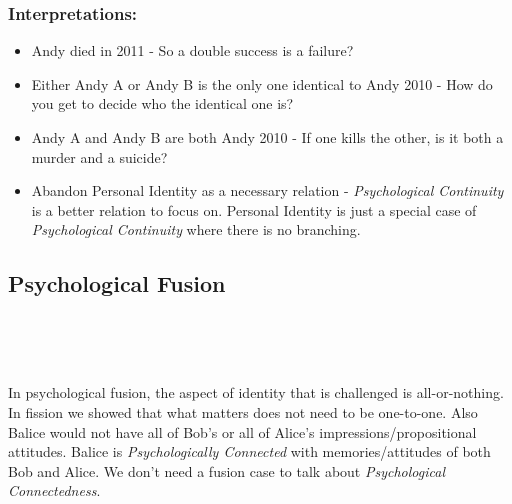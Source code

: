 \documentclass[11pt]{article}
\begin{document}
\subsubsection*{Interpretations:}
\label{sec:org25afbcd}
\begin{itemize}
\item Andy died in 2011 -
\label{sec:org915f9e2}
So a double success is a failure?

\item Either Andy A or Andy B is the only one identical to Andy 2010 -
\label{sec:orgb4a4466}
How do you get to decide who the identical one is?

\item Andy A and Andy B are both Andy 2010 -
\label{sec:org8d8d99a}
If one kills the other, is it both a murder and a suicide?
\item Abandon Personal Identity as a necessary relation -
\label{sec:org2e0b1d0}
\emph{Psychological Continuity} is a better relation to focus on. Personal Identity is just a special case of \emph{Psychological Continuity} where there is no branching.
\end{itemize}

\subsection*{Psychological Fusion}
\label{sec:orgf9b7212}
\\\empty
{}
\\\empty

In psychological fusion, the aspect of identity that is challenged is all-or-nothing.
In fission we showed that what matters does not need to be one-to-one.
Also Balice would not have all of Bob's or all of Alice's impressions/propositional attitudes.
Balice is \emph{Psychologically Connected} with memories/attitudes of both Bob and Alice.
We don't need a fusion case to talk about \emph{Psychological Connectedness}.
\\\empty
\\\empty
{}
\end{document}

